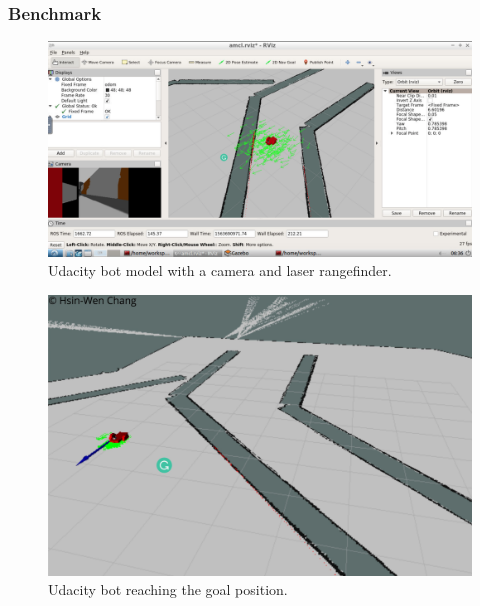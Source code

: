 \documentclass[10pt,journal,compsoc]{IEEEtran}
\begin{document}
\subsubsection{Benchmark}
\begin{figure}[thpb]
      \centering
      \includegraphics[width=\linewidth]{acml.png}
      \caption{Udacity bot model with a camera and laser rangefinder.}
      \label{fig:robot1}
\end{figure}
\begin{figure}[thpb]
      \centering
      \includegraphics[width=\linewidth]{f2.png}
      \caption{Udacity bot reaching the goal position.}
      \label{fig:robot1}
\end{figure}
\end{document}
